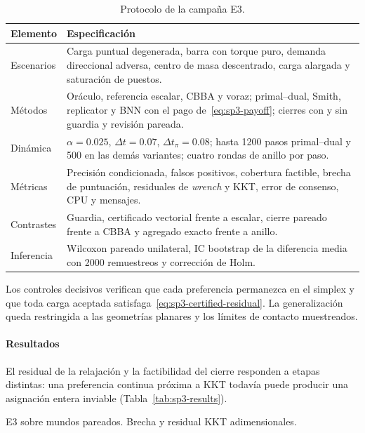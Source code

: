 \begin{table}[!htbp]
  \centering
  \caption{Protocolo de la campaña E3.}
  \label{tab:sp3-design}
  \viutablefont
  \begin{tabularx}{0.96\textwidth}{>{\raggedright\arraybackslash}p{2.35cm} Y}
    \toprule
    Elemento & Especificación \\
    \midrule
    Escenarios & Carga puntual degenerada, barra con torque puro, demanda direccional adversa, centro de masa descentrado, carga alargada y saturación de puestos. \\
    Métodos & Oráculo, referencia escalar, CBBA y voraz; primal--dual, Smith, replicator y BNN con el pago de~\eqref{eq:sp3-payoff}; cierres con y sin guardia y revisión pareada. \\
    Dinámica & $\alpha=0.025$, $\Delta t=0.07$, $\Delta t_\pi=0.08$; hasta 1200 pasos primal--dual y 500 en las demás variantes; cuatro rondas de anillo por paso. \\
    Métricas & Precisión condicionada, falsos positivos, cobertura factible, brecha de puntuación, residuales de \emph{wrench} y KKT, error de consenso, CPU y mensajes. \\
    Contrastes & Guardia, certificado vectorial frente a escalar, cierre pareado frente a CBBA y agregado exacto frente a anillo. \\
    Inferencia & Wilcoxon pareado unilateral, IC \mbox{bootstrap} de la diferencia media con 2000 remuestreos y corrección de Holm. \\
    \bottomrule
  \end{tabularx}
\end{table}

Los controles decisivos verifican que cada preferencia permanezca en el simplex y que toda carga aceptada satisfaga~\eqref{eq:sp3-certified-residual}. La generalización queda restringida a las geometrías planares y los límites de contacto muestreados.

\paragraph{Resultados}

El residual de la relajación y la factibilidad del cierre responden a etapas distintas: una preferencia continua próxima a KKT todavía puede producir una asignación entera inviable (Tabla~\ref{tab:sp3-results}).

\begin{table}[!htbp]
  \centering
  \caption[E3 sobre 600 mundos pareados. Brecha y residual KKT adimensionales.]{E3 sobre \SPThreeWorlds{} mundos pareados. Brecha y residual KKT adimensionales.}
  \label{tab:sp3-results}
  \resizebox{\textwidth}{!}{}
  \viuownsource
\end{table}



